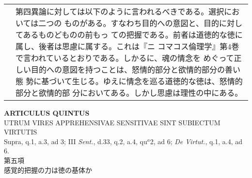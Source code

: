\documentclass[10pt]{jsarticle}
\begin{document}
\begin{longtable}{p{21em}p{21em}}
&

第四異論に対しては以下のように言われるべきである。選択においては二つの
ものがある。すなわち目的への意図と、目的に対してあるものどものの前もっ
ての把握である。前者は道徳的な徳に属し、後者は思慮に属する。これは『ニ
コマコス倫理学』第4巻で言われているとおりである。しかるに、魂の情念を
めぐって正しい目的への意図を持つことは、怒情的部分と欲情的部分の善い態
勢に基づいて生じる。ゆえに情念を巡る道徳的な徳は、怒情的部分と欲情的部
分においてある。しかし思慮は理性の中にある。

\end{longtable}
\newpage

\begin{center}
{\Large {\bf ARTICULUS QUINTUS}}\\
{\large UTRUM VIRES APPREHENSIVAE SENSITIVAE SINT SUBIECTUM VIRTUTIS}\\
{\footnotesize Supra, q.1, a.3, ad 3; III {\itshape Sent.}, d.33, q.2, a.4, qu$^{a}$2, ad 6; {\itshape De Virtut.}, q.1, a.4, ad 6.}\\
{\Large 第五項\\感覚的把握の力は徳の基体か}
\end{center}
\end{document}
